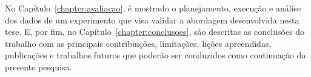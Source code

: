 No Capítulo~\ref{chapter:avaliacao}, é mostrado o planejamento, execução e análise dos dados de um experimento que visa validar a abordagem desenvolvida nesta tese. E, por fim, no Capítulo~\ref{chapter:conclusoes}, são descritas as conclusões do trabalho com as principais contribuições, limitações, lições apreendidas, publicações e trabalhos futuros que poderão ser conduzidos como continuação da presente pesquisa.




